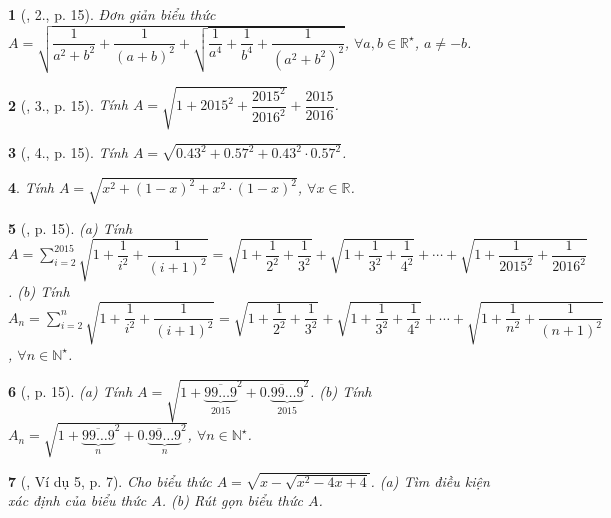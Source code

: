 \documentclass{article}
\newtheorem{baitoan}{}%
\begin{document}
\begin{baitoan}[\cite{Binh_boi_duong_Toan_9_tap_1}, 2., p. 15]
	Đơn giản biểu thức $A = \sqrt{\dfrac{1}{a^2 + b^2} + \dfrac{1}{(a + b)^2} + \sqrt{\dfrac{1}{a^4} + \dfrac{1}{b^4} + \dfrac{1}{(a^2 + b^2)^2}}}$, $\forall a,b\in\mathbb{R}^\star$, $a\ne-b$.
\end{baitoan}

\begin{baitoan}[\cite{Binh_boi_duong_Toan_9_tap_1}, 3., p. 15]
	Tính $A = \sqrt{1 + 2015^2 + \dfrac{2015^2}{2016^2}} + \dfrac{2015}{2016}$.
\end{baitoan}

\begin{baitoan}[\cite{Binh_boi_duong_Toan_9_tap_1}, 4., p. 15]
	Tính $A = \sqrt{0.43^2 + 0.57^2 + 0.43^2\cdot0.57^2}$.
\end{baitoan}

\begin{baitoan}
	Tính $A = \sqrt{x^2 + (1 - x)^2 + x^2\cdot(1 - x)^2}$, $\forall x\in\mathbb{R}$.
\end{baitoan}

\begin{baitoan}[\cite{Binh_boi_duong_Toan_9_tap_1}, p. 15]
	(a) Tính $A = \sum_{i=2}^{2015} \sqrt{1 + \dfrac{1}{i^2} + \dfrac{1}{(i + 1)^2}} = \sqrt{1 + \dfrac{1}{2^2} + \dfrac{1}{3^2}} + \sqrt{1 + \dfrac{1}{3^2} + \dfrac{1}{4^2}} + \cdots + \sqrt{1 + \dfrac{1}{2015^2} + \dfrac{1}{2016^2}}$. (b) Tính $A_n = \sum_{i=2}^n \sqrt{1 + \dfrac{1}{i^2} + \dfrac{1}{(i + 1)^2}} = \sqrt{1 + \dfrac{1}{2^2} + \dfrac{1}{3^2}} + \sqrt{1 + \dfrac{1}{3^2} + \dfrac{1}{4^2}} + \cdots + \sqrt{1 + \dfrac{1}{n^2} + \dfrac{1}{(n + 1)^2}}$, $\forall n\in\mathbb{N}^\star$.
\end{baitoan}

\begin{baitoan}[\cite{Binh_boi_duong_Toan_9_tap_1}, p. 15]
	(a) Tính $A = \sqrt{1 + \overline{\underbrace{99\ldots9}_{2015}}^2 + \overline{0.\underbrace{99\ldots9}_{2015}}^2}$. (b) Tính $A_n = \sqrt{1 + \overline{\underbrace{99\ldots9}_n}^2 + \overline{0.\underbrace{99\ldots9}_n}^2}$, $\forall n\in\mathbb{N}^\star$.
\end{baitoan}


\begin{baitoan}[\cite{Binh_Toan_9_tap_1}, Ví dụ 5, p. 7]
	Cho biểu thức $A = \sqrt{x - \sqrt{x^2 - 4x + 4}}$. (a) Tìm điều kiện xác định của biểu thức $A$. (b) Rút gọn biểu thức $A$.
\end{baitoan}
\end{document}
